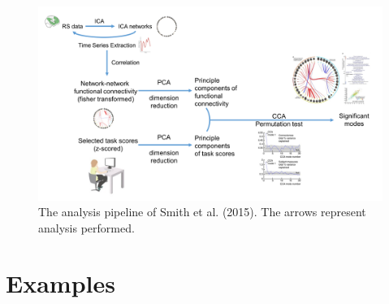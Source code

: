 \begin{figure}[H]
    \centering
    \includegraphics[width=1\textwidth]{cca/image/ccafig2.png}
    \caption{The analysis pipeline of Smith et al. (2015). The arrows represent analysis performed.}

    \label{fig:methods:fig2}
\end{figure}

\section{Examples}

